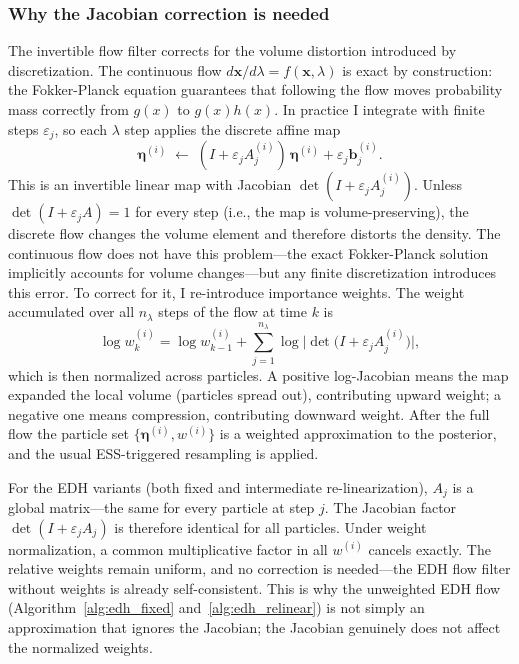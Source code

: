\documentclass{article}
\renewcommand{\v}[1]{ \ensuremath{ {\mathbf{#1}} }}
\begin{document}
\subsubsection{Why the Jacobian correction is needed}
The invertible flow filter \cite{Li-Particle-Filtering-2017} corrects for the volume distortion introduced by discretization. The continuous flow $d\v{x}/d\lambda = f(\v{x},\lambda)$ is exact by construction: the Fokker-Planck equation guarantees that following the flow moves probability mass correctly from $g(x)$ to $g(x)h(x)$. In practice I integrate with finite steps $\varepsilon_j$, so each $\lambda$ step applies the discrete affine map
\begin{equation}
    \boldsymbol{\eta}^{(i)} \;\leftarrow\; (I + \varepsilon_j A^{(i)}_j)\,\boldsymbol{\eta}^{(i)} + \varepsilon_j \mathbf{b}^{(i)}_j.
\end{equation}
This is an invertible linear map with Jacobian $\det(I + \varepsilon_j A^{(i)}_j)$. Unless $\det(I + \varepsilon_j A) = 1$ for every step (i.e., the map is volume-preserving), the discrete flow changes the volume element and therefore distorts the density. The continuous flow does not have this problem—the exact Fokker-Planck solution implicitly accounts for volume changes—but any finite discretization introduces this error. To correct for it, I re-introduce importance weights. The weight accumulated over all $n_\lambda$ steps of the flow at time $k$ is
\begin{equation}
    \log w_k^{(i)} = \log w_{k-1}^{(i)} + \sum_{j=1}^{n_\lambda} \log \bigl|\det\bigl(I + \varepsilon_j A^{(i)}_j\bigr)\bigr|,
    \label{eq:invertible_weight}
\end{equation}
which is then normalized across particles. A positive log-Jacobian means the map expanded the local volume (particles spread out), contributing upward weight; a negative one means compression, contributing downward weight. After the full flow the particle set $\{\boldsymbol{\eta}^{(i)}, w^{(i)}\}$ is a weighted approximation to the posterior, and the usual ESS-triggered resampling is applied.

For the EDH variants (both fixed and intermediate re-linearization), $A_j$ is a global matrix—the same for every particle at step $j$. The Jacobian factor $\det(I + \varepsilon_j A_j)$ is therefore identical for all particles. Under weight normalization, a common multiplicative factor in all $w^{(i)}$ cancels exactly. The relative weights remain uniform, and no correction is needed—the EDH flow filter without weights is already self-consistent. This is why the unweighted EDH flow (Algorithm~\ref{alg:edh_fixed} and~\ref{alg:edh_relinear}) is not simply an approximation that ignores the Jacobian; the Jacobian genuinely does not affect the normalized weights.
\end{document}
